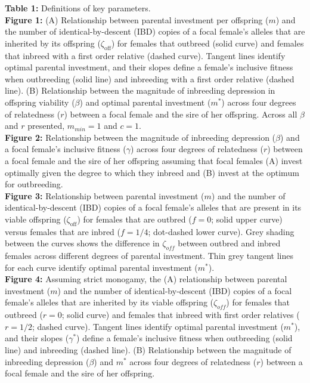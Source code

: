 \documentclass[12pt]{article}
\begin{document}



\clearpage

\noindent \textbf{Table 1:}  Definitions of key parameters. \\

\noindent \textbf{Figure 1:} (A) Relationship between parental investment per offspring ($m$) and the number of identical-by-descent {\color{blue}(IBD)} copies of a focal female's alleles that are inherited by its offspring ($\zeta_{\textrm{off}}$) for females that outbreed (solid curve) and females that inbreed with a first order relative (dashed curve). Tangent lines identify optimal parental investment, and their slopes define a female's inclusive fitness when outbreeding (solid line) and inbreeding with a first order relative (dashed line). (B) Relationship between the magnitude of inbreeding depression in offspring viability ($\beta$) and optimal parental investment ($m^{*}$) across four degrees of relatedness ($r$) between a focal female and the sire of her offspring. Across all $\beta$ and $r$ presented, $m_{min}=1$ and $c=1$. \\

\noindent \textbf{Figure 2:} Relationship between the magnitude of inbreeding depression ($\beta$) and a focal female's inclusive fitness ($\gamma$) across four degrees of relatedness ($r$) between a focal female and the sire of her offspring assuming that focal females (A) invest optimally given the degree to which they inbreed and (B) invest at the optimum for outbreeding. \\

\noindent \textbf{Figure 3:} Relationship between parental investment ($m$) and the number of identical-by-descent {\color{blue}(IBD)} copies of a focal female's alleles that are present in its viable offspring ($\zeta_{\textrm{off}}$) for females that are outbred ($f=0$; solid upper curve) versus females that are inbred ($f=1/4$; dot-dashed lower curve). Grey shading between the curves shows the difference in $\zeta_{off}$ between outbred and inbred females across different degrees of parental investment. Thin grey tangent lines for each curve identify optimal parental investment ($m^{*}$). \\

\noindent \textbf{Figure 4:} Assuming strict monogamy, the (A) relationship between parental investment ($m$) and the number of identical-by-descent {\color{blue}(IBD)} copies of a focal female's alleles that are inherited by its viable offspring ($\zeta_{off}$) for females that outbreed ($r=0$; solid curve) and females that inbreed with first order relatives ($r=1/2$; dashed curve). Tangent lines identify optimal parental investment ($m^{*}$), and their slopes ($\gamma^{*}$) define a female's inclusive fitness when outbreeding (solid line) and inbreeding (dashed line). (B) Relationship between the magnitude of inbreeding depression ($\beta$) and $m^{*}$ across four degrees of relatedness ($r$) between a focal female and the sire of her offspring. \\
\end{document}
